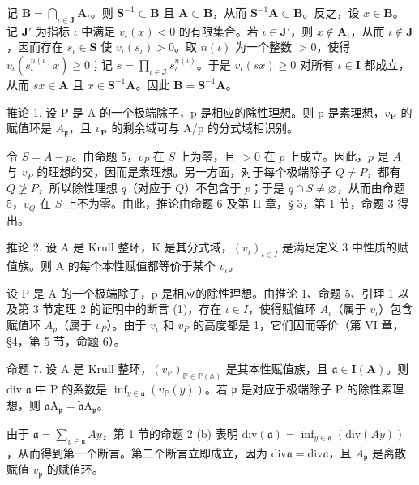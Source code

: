 记 \(\mathbf{B} = \bigcap_{\iota \in \mathbf{J}} \mathbf{A}_{\iota}\)。则 \(\mathbf{S}^{-1} \subset \mathbf{B}\) 且 \(\mathbf{A} \subset \mathbf{B}\)，从而 \(\mathbf{S}^{-1}\mathbf{A} \subset \mathbf{B}\)。反之，设 \(x \in \mathbf{B}\)。记 \(\mathbf{J}'\) 为指标 \(\iota\) 中满足 \(v_{\iota}(x) < 0\) 的有限集合。若 \(\iota \in \mathbf{J}'\)，则 \(x \notin \mathbf{A}_{\iota}\)，从而 \(\iota \notin \mathbf{J}\)，因而存在 \(s_{\iota} \in \mathbf{S}\) 使 \(v_{\iota}(s_{\iota}) > 0\)。取 \(n(\iota)\) 为一个整数 \(>0\)，使得 \(v_{\iota}(s_{\iota}^{n(\iota)}x) \geqslant 0\)；记 \(s = \prod_{\iota \in \mathbf{J}} s_{\iota}^{n(\iota)}\)。于是 \(v_{\iota}(sx) \geqslant 0\) 对所有 \(\iota \in \mathbf{I}\) 都成立，从而 \(sx \in \mathbf{A}\) 且 \(x \in \mathbf{S}^{-1}\mathbf{A}\)。因此 \(\mathbf{B} = \mathbf{S}^{-1}\mathbf{A}\)。

推论 1. 设 P 是 A 的一个极端除子，p 是相应的除性理想。则 p 是素理想，\(v_{\mathbf{P}}\) 的赋值环是 \(A_{\mathfrak{p}}\)，且 \(v_{\mathbf{P}}\) 的剩余域可与 A/p 的分式域相识别。

令 \(S = A - p\)。由命题 5，\(v_{P}\) 在 \(S\) 上为零，且 \(>0\) 在 \(p\) 上成立。因此，\(p\) 是 \(A\) 与 \(v_{P}\) 的理想的交，因而是素理想。另一方面，对于每个极端除子 \(Q \neq P\)，都有 \(Q \not\geq P\)，所以除性理想 \(q\)（对应于 \(Q\)）不包含于 \(p\)；于是 \(q \cap S \neq \varnothing\)，从而由命题 5，\(v_{Q}\) 在 \(S\) 上不为零。由此，推论由命题 6 及第 II 章，§ 3，第 1 节，命题 3 得出。

推论 2. 设 A 是 Krull 整环，K 是其分式域，\((v_{\iota})_{\iota\in I}\) 是满足定义 3 中性质的赋值族。则 A 的每个本性赋值都等价于某个 \(v_{\iota}\)。

设 P 是 A 的一个极端除子，p 是相应的除性理想。由推论 1、命题 5、引理 1 以及第 3 节定理 2 的证明中的断言 (1)，存在 \(\iota \in I\)，使得赋值环 \(A_{\iota}\)（属于 \(v_{\iota}\)）包含赋值环 \(A_{p}\)（属于 \(v_{P}\)）。由于 \(v_{\iota}\) 和 \(v_{P}\) 的高度都是 1，它们因而等价（第 VI 章，§4，第 5 节，命题 6）。

命题 7. 设 A 是 Krull 整环，\((v_{\mathbb{P}})_{\mathbb{P} \in \mathbb{P}(\mathbb{A})}\) 是其本性赋值族，且 \(\mathfrak{a} \in \mathbf{I}(\mathbf{A})\)。则 div \(\mathfrak{a}\) 中 P 的系数是 \(\inf_{y \in \mathfrak{a}} (v_{\mathbb{P}}(y))\)。若 \(\mathfrak{p}\) 是对应于极端除子 P 的除性素理想，则 \(\mathfrak{a}\mathrm{A}_{\mathfrak{p}} = \tilde{\mathfrak{a}}\mathrm{A}_{\mathfrak{p}}\)。

由于 \(\mathfrak{a} = \sum_{y \in \mathfrak{a}} Ay\)，第 1 节的命题 2 (b) 表明 \(\text{div}(\mathfrak{a}) = \inf_{y \in \mathfrak{a}} (\text{div}(Ay))\)，从而得到第一个断言。第二个断言立即成立，因为 \(\text{div} \tilde{\mathfrak{a}} = \text{div} \mathfrak{a}\)，且 \(A_{\mathfrak{p}}\) 是离散赋值 \(v_{\mathfrak{p}}\) 的赋值环。

